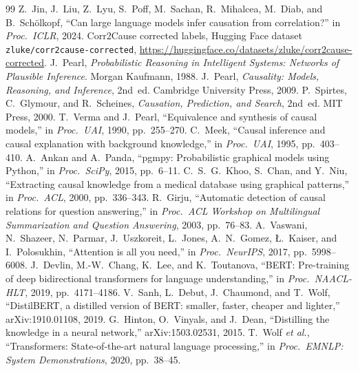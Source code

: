 \documentclass[12pt,a4paper]{article}
\begin{document}
\begingroup
\small
\renewcommand{\refname}{References}
\begin{thebibliography}{99}\setlength{\itemsep}{2pt}
 Z.~Jin, J.~Liu, Z.~Lyu, S.~Poff, M.~Sachan, R.~Mihalcea, M.~Diab, and B.~Sch\"olkopf, ``Can large language models infer causation from correlation?'' in \emph{Proc.\ ICLR}, 2024.
 Corr2Cause corrected labels, Hugging Face dataset \texttt{zluke/corr2cause-corrected}, \url{https://huggingface.co/datasets/zluke/corr2cause-corrected}.
 J.~Pearl, \emph{Probabilistic Reasoning in Intelligent Systems: Networks of Plausible Inference}. Morgan Kaufmann, 1988.
 J.~Pearl, \emph{Causality: Models, Reasoning, and Inference}, 2nd~ed. Cambridge University Press, 2009.
 P.~Spirtes, C.~Glymour, and R.~Scheines, \emph{Causation, Prediction, and Search}, 2nd~ed. MIT Press, 2000.
 T.~Verma and J.~Pearl, ``Equivalence and synthesis of causal models,'' in \emph{Proc.\ UAI}, 1990, pp.~255--270.
 C.~Meek, ``Causal inference and causal explanation with background knowledge,'' in \emph{Proc.\ UAI}, 1995, pp.~403--410.
 A.~Ankan and A.~Panda, ``pgmpy: Probabilistic graphical models using Python,'' in \emph{Proc.\ SciPy}, 2015, pp.~6--11.
 C.~S.~G.~Khoo, S.~Chan, and Y.~Niu, ``Extracting causal knowledge from a medical database using graphical patterns,'' in \emph{Proc.\ ACL}, 2000, pp.~336--343.
 R.~Girju, ``Automatic detection of causal relations for question answering,'' in \emph{Proc.\ ACL Workshop on Multilingual Summarization and Question Answering}, 2003, pp.~76--83.
 A.~Vaswani, N.~Shazeer, N.~Parmar, J.~Uszkoreit, L.~Jones, A.~N.~Gomez, {\L}.~Kaiser, and I.~Polosukhin, ``Attention is all you need,'' in \emph{Proc.\ NeurIPS}, 2017, pp.~5998--6008.
 J.~Devlin, M.-W.~Chang, K.~Lee, and K.~Toutanova, ``BERT: Pre-training of deep bidirectional transformers for language understanding,'' in \emph{Proc.\ NAACL-HLT}, 2019, pp.~4171--4186.
 V.~Sanh, L.~Debut, J.~Chaumond, and T.~Wolf, ``DistilBERT, a distilled version of BERT: smaller, faster, cheaper and lighter,'' arXiv:1910.01108, 2019.
 G.~Hinton, O.~Vinyals, and J.~Dean, ``Distilling the knowledge in a neural network,'' arXiv:1503.02531, 2015.
 T.~Wolf \emph{et al.}, ``Transformers: State-of-the-art natural language processing,'' in \emph{Proc.\ EMNLP: System Demonstrations}, 2020, pp.~38--45.

\end{thebibliography}
\end{document}
